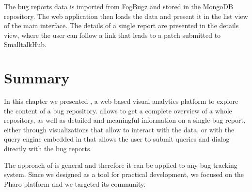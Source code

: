 
The bug reports data is imported from FogBugz and stored in the MongoDB repository.
The web application then loads the data and present it in the list view of the main interface.
The details of a single report are presented in the details view, where the user can follow a link that leads to a patch submitted to SmalltalkHub.
%

\section{Summary}

In this chapter we presented \ib, a web-based visual analytics platform to explore the content of a bug repository.
\ib allows to get a complete overview of a whole repository, as well as detailed and meaningful information on a single bug report, either through visualizations that allow to interact with the data, or with the query engine embedded in \ib that allows the user to submit queries and dialog directly with the bug reports.


The approach of \ib is general and therefore it can be applied to any bug tracking system.
Since we designed \ib as a tool for practical development, we focused on the Pharo platform and we targeted its community.







